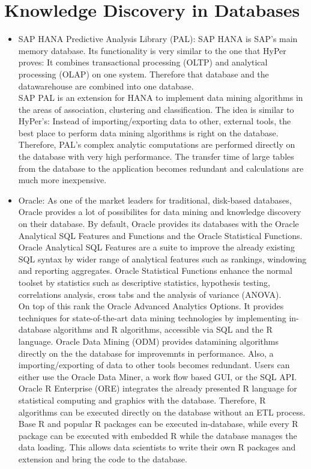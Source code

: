 \section{Knowledge Discovery in Databases}
\begin{itemize}
\item SAP HANA Predictive Analysis Library (PAL): SAP HANA is SAP's main memory database. Its functionality is very similar to the one that HyPer proves: It combines transactional processing (OLTP) and analytical processing (OLAP) on one system. Therefore that database and the datawarehouse are combined into one database. 
\\
SAP PAL is an extension for HANA to implement data mining algorithms in the areas of association, clustering and classification. The idea is similar to HyPer's: Instead of importing/exporting data to other, external tools, the best place to perform data mining algorithms is right on the database. Therefore, PAL's complex analytic computations are performed directly on the database with very high performance. The transfer time of large tables from the database to the application becomes redundant and calculations are much more inexpensive.

\item Oracle: As one of the market leaders for traditional, disk-based databases, Oracle provides a lot of possibilites for data mining and knowledge discovery on their database. By default, Oracle provides its databases with the Oracle Analytical SQL Features and Functions and the Oracle Statistical Functions. Oracle Analytical SQL Features are a suite to improve the already existing SQL syntax by wider range of analytical features such as rankings, windowing and reporting aggregates. Oracle Statistical Functions enhance the normal toolset by statistics such as descriptive statistics, hypothesis testing, correlations analysis, cross tabs and the analysis of variance (ANOVA). 
\\
On top of this rank the Oracle Advanced Analytics Options. It provides techniques for state-of-the-art data mining technologies by implementing in-database algorithms and R algorithms, accessible via SQL and the R language. Oracle Data Mining (ODM) provides datamining algorithms directly on the the database for improvemnts in performance. Also, a importing/exporting of data to other tools becomes redundant. Users can either use the Oracle Data Miner, a work flow based GUI, or the SQL API. Oracle R Enterprise (ORE) integrates the already presented R language for statistical computing and graphics with the database. Therefore, R algorithms can be executed directly on the database without an ETL process. Base R and popular R packages can be executed in-database, while every R package can be executed with embedded R while the database manages the data loading. This allows data scientists to write their own R packages and extension and bring the code to the database.

\end{itemize}


